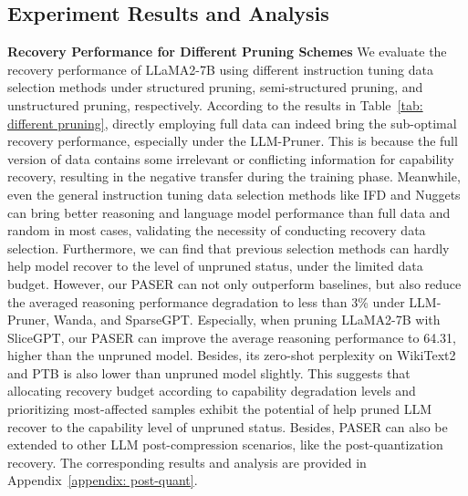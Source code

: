 \subsection{Experiment Results and Analysis}
\textbf{Recovery Performance for Different Pruning Schemes}
We evaluate the recovery performance of LLaMA2-7B using different instruction tuning data selection methods under structured pruning, semi-structured pruning, and unstructured pruning, respectively. According to the results in Table~\ref{tab: different pruning}, directly employing full data can indeed bring the sub-optimal recovery performance, especially under the LLM-Pruner. This is because the full version of data contains some irrelevant or conflicting information for capability recovery, resulting in the negative transfer during the training phase. Meanwhile, even the general instruction tuning data selection methods like IFD and Nuggets can bring better reasoning and language model performance than full data and random in most cases, validating the necessity of conducting recovery data selection. Furthermore, we can find that previous selection methods can hardly help model recover to the level of unpruned status, under the limited data budget. However, our PASER can not only outperform baselines, but also reduce the averaged reasoning performance degradation to less than 3\% under LLM-Pruner, Wanda, and SparseGPT. Especially, when pruning LLaMA2-7B with SliceGPT, our PASER can improve the average reasoning performance to 64.31, higher than the unpruned model. Besides, its zero-shot perplexity on WikiText2 and PTB is also lower than unpruned model slightly. This suggests that allocating recovery budget according to capability degradation levels and prioritizing most-affected samples exhibit the potential of help pruned LLM recover to the capability level of unpruned status. Besides, PASER can also be extended to other LLM post-compression scenarios, like the post-quantization recovery. The corresponding results and analysis are provided in Appendix~\ref{appendix: post-quant}.

